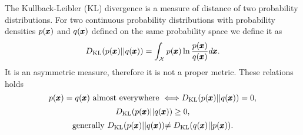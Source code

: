 The Kullback-Leibler (KL) divergence is a measure of distance of two probability distributions. For two continuous probability distributions with probability densities $p(\pmb{{x}})$ and $q(\pmb{{x}})$ defined on the same probability space we define it as
\begin{equation}
D_{\text{KL}}\left(p(\vc{x})||q(\vc{x})\right)=\int_{\mathcal{X}}p(\vc{x})\ln\frac{p(\vc{x})}{q(\vc{x})}d\vc{x}.\label{eq:kld}
\end{equation}
It is an asymmetric measure, therefore it is not a proper metric. These relations holds
\begin{equation}
p(\vc{x})=q(\vc{x})\text{ almost everywhere }\Longleftrightarrow D_{\text{KL}}\left(p(\vc{x})||q(\vc{x})\right)=0,
\end{equation}
\begin{equation}
D_{\text{KL}}\left(p(\vc{x})||q(\vc{x})\right)\geq0,
\end{equation}
\begin{equation}
\text{\text{generally} \ensuremath{D_{\text{KL}}\left(p(\vc{x})||q(\vc{x})\right)}\ensuremath{\ensuremath{\neq D_{\text{KL}}\left(q(\vc{x})||p(\vc{x})\right)}}.}
\end{equation}


